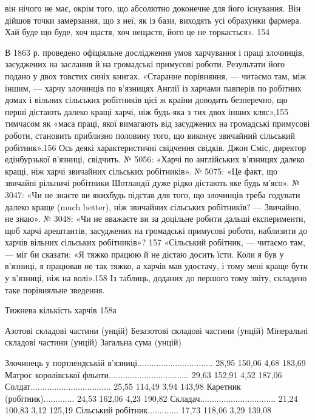 він нічого не має, окрім того, що абсолютно доконечне для його
існування. Він дійшов точки замерзання, що з неї, як із бази,
виходять усі обрахунки фармера. Хай буде що буде, хоч щастя,
хоч нещастя, його це не торкається». 154

В 1863 р. проведено офіціяльне дослідження умов харчування
і праці злочинців, засуджених на заслання й на громадські примусові
роботи. Результати його подано у двох товстих синіх
книгах. «Старанне порівняння, — читаємо там, між іншим, —
харчу злочинців по в’язницях Англії із харчами павперів по
робітних домах і вільних сільських робітників цієї ж країни
доводить безперечно, що перші дістають далеко кращі харчі,
ніж будь-яка з тих двох інших кляс»,155 тимчасом як «маса
праці, якої вимагають від засуджених на громадські примусові
роботи, становить приблизно половину того, що виконує звичайний
сільський робітник».156 Ось деякі характеристичні свідчення
свідків. Джон Сміс, директор едінбурзької в’язниці, свідчить.
№ 5056: «Харчі по англійських в’язницях далеко кращі, ніж
харчі звичайних сільських робітників». № 5075: «Це факт, що
звичайні рільничі робітники Шотландії дуже рідко дістають яке
будь м’ясо». № 3047: «Чи не знаєте ви якихбудь підстав для
того, що злочинців треба годувати далеко краще (much better),
ніж звичайних сільських робітників? — Звичайно, не знаю».
№ 3048: «Чи не вважаєте ви за доцільне робити дальші експерименти,
щоб харчі арештантів, засуджених на громадські примусові
роботи, наблизити до харчів вільних сільських робітників»?
157 «Сільський робітник, — читаємо там, — міг би сказати:
«Я тяжко працюю й не дістаю досить їсти. Коли я був у
в’язниці, я працював не так тяжко, а харчів мав удостачу, і тому
мені краще бути у в’язниці, ніж на волі».158 Із таблиць, доданих
до першого тому звіту, складено таке порівняльне зведення.

Тижнева кількість харчів 158а

Азотові  складові  частини (унцій)
Безазотові  складові  частини (унцій)
Мінеральні  складові  частини (унцій)
Загальна  сума (унцій)

Злочинець у портлендській
в’язниці................................                28,95                150,06               
4,68                  183,69
Матрос королівської
фльоти..................................                29,63                152,91              
4,52                   187,06
Солдат..................................                25,55                114,49               
3,94                   143,98
Каретник (робітник).............                24,53                162,06                4,23     
             190,82
Складач................................                21,24                100,83               
3,12                   125,19
Сільський робітник.............                 17,73                 118,06                3,29    
              139,08

